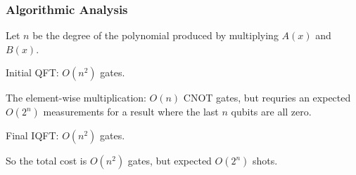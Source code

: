 \documentclass[
	11pt, %
]{beamer}
\begin{document}


\begin{frame}
    \frametitle{Algorithmic Analysis}
    Let $n$ be the degree of the polynomial produced by multiplying $A(x)$ and $B(x)$.

    \bigskip
    Initial QFT: $O(n^2)$ gates.

    \bigskip
    The element-wise multiplication: $O(n)$ CNOT gates, 
    but requries an expected $O(2^n)$ measurements for a result where 
    the last $n$ qubits are all zero.

    \bigskip
    Final IQFT: $O(n^2)$ gates.

    \bigskip
    So the total cost is $O(n^2)$ gates, but expected $O(2^n)$ shots.
\end{frame}

\end{document}
